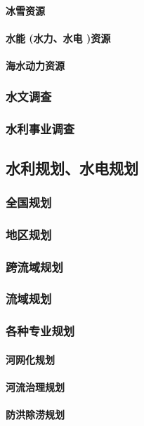 \documentclass[UTF8]{../../ApplicationUniverse}
\begin{document}
            \paragraph{冰雪资源}
            \paragraph{水能 (水力、水电 )资源}
            \paragraph{海水动力资源}
        \subsubsection{水文调查}
        \subsubsection{水利事业调查}
    \subsection{水利规划、水电规划}
        \subsubsection{全国规划}
        \subsubsection{地区规划}
        \subsubsection{跨流域规划}
        \subsubsection{流域规划}
        \subsubsection{各种专业规划}
            \paragraph{河网化规划}
            \paragraph{河流治理规划}
            \paragraph{防洪除涝规划}
\end{document}
